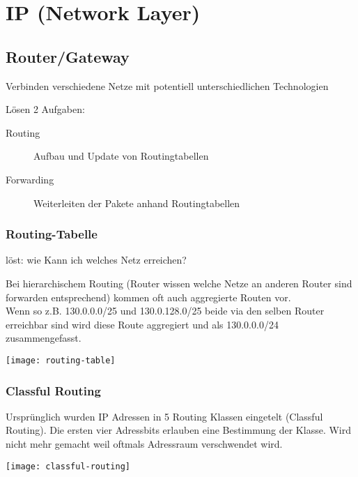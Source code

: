 \section{IP (Network Layer)}

\subsection{Router/Gateway}
Verbinden verschiedene Netze mit potentiell unterschiedlichen Technologien

Lösen 2 Aufgaben:
\begin{description}
    \item[Routing] Aufbau und Update von Routingtabellen
    \item[Forwarding] Weiterleiten der Pakete anhand Routingtabellen
\end{description}

\subsubsection{Routing-Tabelle}
löst: wie Kann ich welches Netz erreichen?

Bei hierarchischem Routing (Router wissen welche Netze an anderen Router sind
forwarden entsprechend) kommen oft auch aggregierte Routen vor.\\
Wenn so z.B. 130.0.0.0/25 und 130.0.128.0/25 beide via den selben Router
erreichbar sind wird diese Route aggregiert und als 130.0.0.0/24 zusammengefasst.

\begin{center}
    \texttt{[image: routing-table]}
\end{center}

\subsubsection{Classful Routing}

Ursprünglich wurden IP Adressen in 5 Routing Klassen eingetelt (Classful Routing).
Die ersten vier Adressbits erlauben eine Bestimmung der Klasse.
Wird nicht mehr gemacht weil oftmals Adressraum verschwendet wird.

\begin{center}
    \texttt{[image: classful-routing]}
\end{center}

